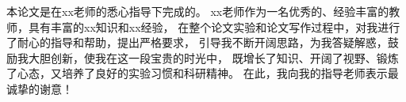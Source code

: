\acks
本论文是在xx老师的悉心指导下完成的。
xx老师作为一名优秀的、经验丰富的教师，具有丰富的xx知识和xx经验，
在整个论文实验和论文写作过程中，对我进行了耐心的指导和帮助，提出严格要求，
引导我不断开阔思路，为我答疑解惑，鼓励我大胆创新，使我在这一段宝贵的时光中，
既增长了知识、开阔了视野、锻炼了心态，又培养了良好的实验习惯和科研精神。
在此，我向我的指导老师表示最诚挚的谢意！
